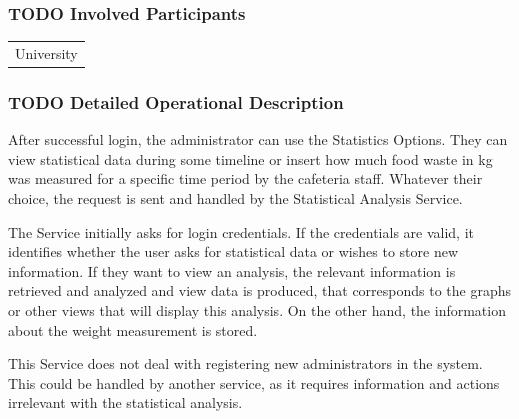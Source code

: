 \documentclass[11pt]{article}
\begin{document}
\subsubsection{{\bfseries\sffamily TODO} Involved Participants}
\label{sec:org707126c}
\begin{center}
\begin{tabular}{l}
University\\
\end{tabular}
\end{center}
\subsubsection{{\bfseries\sffamily TODO} Detailed Operational Description}
\label{sec:org67ca474}
After successful login, the administrator can use the Statistics
Options. They can view statistical data during some timeline or
insert how much food waste in kg was measured for a specific time
period by the cafeteria staff. Whatever their choice, the request
is sent and handled by the Statistical Analysis Service.

The Service initially asks for login credentials. If the
credentials are valid, it identifies whether the user asks for
statistical data or wishes to store new information. If they want
to view an analysis, the relevant information is retrieved and
analyzed and view data is produced, that corresponds to the graphs
or other views that will display this analysis. On the other hand,
the information about the weight measurement is stored.

This Service does not deal with registering new administrators in
the system. This could be handled by another service, as it
requires information and actions irrelevant with the statistical
analysis.
\end{document}
